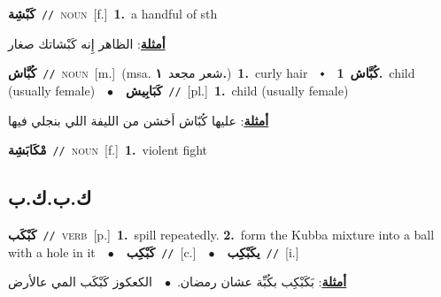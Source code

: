 \documentclass[10pt,a4paper,twoside]{article} %
\begin{document}
\begin{multicols}{2}
{\setlength\topsep{0pt}\textbf{\foreignlanguage{arabic}{كَبْشِة}}\ {\color{gray}\texttt{//}\color{black}}\ \textsc{noun}\ [f.]\ \textbf{1.}~a handful of sth\  \begin{flushright}\color{gray}\foreignlanguage{arabic}{\textbf{\underline{\foreignlanguage{arabic}{أمثلة}}}: الظاهر إِنه كَبْشاتك صغار}\end{flushright}\color{black}} \vspace{2mm}

{\setlength\topsep{0pt}\textbf{\foreignlanguage{arabic}{كُبَّاش}}\ {\color{gray}\texttt{//}\color{black}}\ \textsc{noun}\ [m.]\ \color{gray}(msa. \foreignlanguage{arabic}{شعر مجعد}~\foreignlanguage{arabic}{\textbf{١.}})\color{black}\ \textbf{1.}~curly hair\ \ $\smblkdiamond$\ \ \setlength\topsep{0pt}\textbf{\foreignlanguage{arabic}{كُبَّاش}}\ \textbf{1.}~child (usually female)\ \ $\bullet$\ \ \setlength\topsep{0pt}\textbf{\foreignlanguage{arabic}{كَبَابِيش}}\ {\color{gray}\texttt{//}\color{black}}\ [pl.]\ \textbf{1.}~child (usually female)\  \begin{flushright}\color{gray}\foreignlanguage{arabic}{\textbf{\underline{\foreignlanguage{arabic}{أمثلة}}}: عليها كُبّاش أخشن من الليفة اللي بنجلي فيها}\end{flushright}\color{black}} \vspace{2mm}

{\setlength\topsep{0pt}\textbf{\foreignlanguage{arabic}{مْكَابَشِة}}\ {\color{gray}\texttt{//}\color{black}}\ \textsc{noun}\ [f.]\ \textbf{1.}~violent fight\ } \vspace{2mm}

\vspace{-3mm}
\subsection*{\color{blue}\foreignlanguage{arabic}{ك.ب.ك.ب}\color{blue}{}} 

{\setlength\topsep{0pt}\textbf{\foreignlanguage{arabic}{كَبْكَب}}\ {\color{gray}\texttt{//}\color{black}}\ \textsc{verb}\ [p.]\ \textbf{1.}~spill repeatedly.  \textbf{2.}~form the Kubba mixture into a ball with a hole in it\ \ $\bullet$\ \ \setlength\topsep{0pt}\textbf{\foreignlanguage{arabic}{كَبْكِب}}\ {\color{gray}\texttt{//}\color{black}}\ [c.]\ \ $\bullet$\ \ \setlength\topsep{0pt}\textbf{\foreignlanguage{arabic}{يكَبْكِب}}\ {\color{gray}\texttt{//}\color{black}}\ [i.]\  \begin{flushright}\color{gray}\foreignlanguage{arabic}{\textbf{\underline{\foreignlanguage{arabic}{أمثلة}}}: بَكَبْكِب بكُبِّة عشان رمضان.\ $\bullet$\ \  الكعكوز كَبْكَب المي عالأرض}\end{flushright}\color{black}} \vspace{2mm}


\end{multicols}
\end{document}
